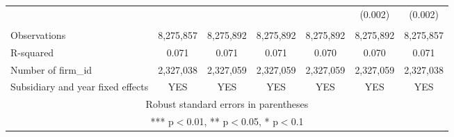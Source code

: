 \begin{tabular}{lcccccc}
 &  &  &  &  & (0.002) & (0.002) \\
 &  &  &  &  &  &  \\
Observations & 8,275,857 & 8,275,892 & 8,275,892 & 8,275,892 & 8,275,892 & 8,275,857 \\
R-squared & 0.071 & 0.071 & 0.071 & 0.070 & 0.070 & 0.071 \\
Number of firm\_id & 2,327,038 & 2,327,059 & 2,327,059 & 2,327,059 & 2,327,059 & 2,327,038 \\
 Subsidiary and year fixed effects & YES & YES & YES & YES & YES & YES \\ \hline
\multicolumn{7}{c}{ Robust standard errors in parentheses} \\
\multicolumn{7}{c}{ *** p$<$0.01, ** p$<$0.05, * p$<$0.1} \\
\end{tabular}
